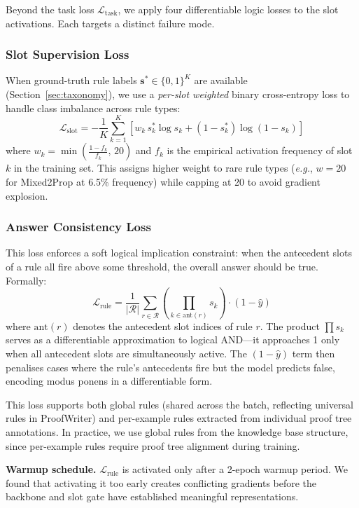 \documentclass[conference]{IEEEtran}
\newcommand{\eg}{\textit{e.g.}}
\begin{document}
Beyond the task loss $\mathcal{L}_\text{task}$, we apply four
differentiable logic losses to the slot activations. Each targets
a distinct failure mode.

\subsubsection{Slot Supervision Loss}
When ground-truth rule labels $\mathbf{s}^* \in \{0,1\}^K$ are
available (Section~\ref{sec:taxonomy}), we use a
\emph{per-slot weighted} binary cross-entropy loss to handle
class imbalance across rule types:
\begin{equation}
    \mathcal{L}_\text{slot} = -\frac{1}{K}\sum_{k=1}^{K}
    \left[w_k\, s^*_k \log s_k + (1-s^*_k)\log(1-s_k)\right]
\end{equation}
where $w_k = \min\!\left(\frac{1-f_k}{f_k},\, 20\right)$ and
$f_k$ is the empirical activation frequency of slot~$k$ in the
training set. This assigns higher weight to rare rule types
(\eg{}, $w=20$ for Mixed2Prop at 6.5\% frequency) while capping
at 20 to avoid gradient explosion.

\subsubsection{Answer Consistency Loss}
This loss enforces a soft logical implication constraint: when the
antecedent slots of a rule all fire above some threshold, the
overall answer should be true. Formally:
\begin{equation}
    \mathcal{L}_\text{rule} = \frac{1}{|\mathcal{R}|} \sum_{r \in \mathcal{R}}
    \left(\prod_{k \in \mathrm{ant}(r)} s_k\right) \cdot (1 - \hat{y})
\end{equation}
where $\mathrm{ant}(r)$ denotes the antecedent slot indices of
rule $r$. The product $\prod s_k$ serves as a differentiable
approximation to logical AND---it approaches 1 only when all
antecedent slots are simultaneously active. The $(1 - \hat{y})$
term then penalises cases where the rule's antecedents fire but
the model predicts false, encoding modus ponens in a differentiable
form.

This loss supports both global rules (shared across the batch,
reflecting universal rules in ProofWriter) and per-example rules
extracted from individual proof tree annotations. In practice,
we use global rules from the knowledge base structure, since
per-example rules require proof tree alignment during training.

\textbf{Warmup schedule.} $\mathcal{L}_\text{rule}$ is activated
only after a 2-epoch warmup period. We found that activating it
too early creates conflicting gradients before the backbone and
slot gate have established meaningful representations.
\end{document}
